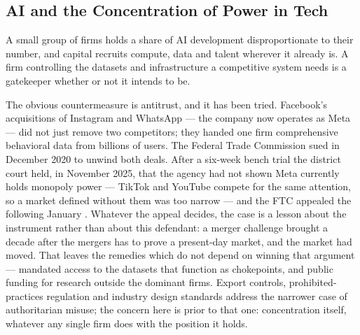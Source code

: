 \subsection{AI and the Concentration of Power in Tech}
\label{sec:8.3.1}
A small group of firms holds a share of AI development disproportionate to their number, and capital recruits compute, data and talent wherever it already is. A firm controlling the datasets and infrastructure a competitive system needs is a gatekeeper whether or not it intends to be.

The obvious countermeasure is antitrust, and it has been tried. Facebook's acquisitions of Instagram and WhatsApp — the company now operates as Meta — did not just remove two competitors; they handed one firm comprehensive behavioral data from billions of users. The Federal Trade Commission sued in December 2020 to unwind both deals. After a six-week bench trial the district court held, in November 2025, that the agency had not shown Meta currently holds monopoly power — TikTok and YouTube compete for the same attention, so a market defined without them was too narrow — and the FTC appealed the following January \autocite{ftc2020metaplatforms}. Whatever the appeal decides, the case is a lesson about the instrument rather than about this defendant: a merger challenge brought a decade after the mergers has to prove a present-day market, and the market had moved. That leaves the remedies which do not depend on winning that argument — mandated access to the datasets that function as chokepoints, and public funding for research outside the dominant firms. Export controls, prohibited-practices regulation and industry design standards address the narrower case of authoritarian misuse; the concern here is prior to that one: concentration itself, whatever any single firm does with the position it holds.
